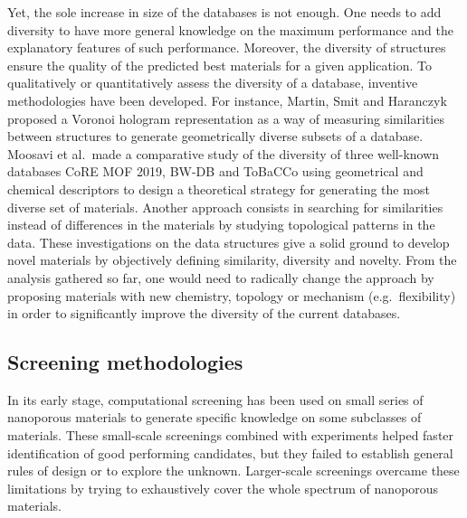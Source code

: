 \documentclass[main.tex]{subfiles}
\begin{document}
Yet, the sole increase in size of the databases is not enough. One needs to add diversity to have more general knowledge on the maximum performance and the explanatory features of such performance. Moreover, the diversity of structures ensure the quality of the predicted best materials for a given application.
To qualitatively or quantitatively assess the diversity of a database, inventive methodologies have been developed.
For instance, Martin, Smit and Haranczyk proposed a Voronoi hologram representation as a way of measuring similarities between structures to generate geometrically diverse subsets of a database.\cite{Martin_2011}
Moosavi et al.\ made a comparative study of the diversity of three well-known databases CoRE MOF 2019,\cite{Chung_2019} BW-DB\cite{Boyd_2016} and ToBaCCo\cite{Gomez_Gualdron_2016, Colon_2017}  using geometrical and chemical descriptors to design a theoretical strategy for generating the most diverse set of materials.\cite{Moosavi_2020}
Another approach consists in searching for similarities instead of differences in the materials by studying topological patterns in the data.\cite{Lee_2017}
These investigations on the data structures give a solid ground to develop novel materials by objectively defining similarity, diversity and novelty. From the analysis gathered so far, one would need to radically change the approach by proposing materials with new chemistry, topology or mechanism (e.g.\ flexibility) in order to significantly improve the diversity of the current databases.

\subsection{Screening methodologies}

In its early stage, computational screening has been used on small series of nanoporous materials to generate specific knowledge on some subclasses of materials. These small-scale screenings combined with experiments helped faster identification of good performing candidates, but they failed to establish general rules of design or to explore the unknown. Larger-scale screenings overcame these limitations by trying to exhaustively cover the whole spectrum of nanoporous materials.
\end{document}
